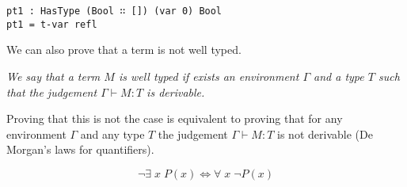 \documentclass{article}
\begin{document}
\begin{verbatim}
pt1 : HasType (Bool ∷ []) (var 0) Bool
pt1 = t-var refl
\end{verbatim}

We can also prove that a term is not well typed.

\vspace{1em}
\textit{We say that a term $M$ is well typed if exists an environment $\Gamma$ and a type $T$ such that the judgement $\Gamma \vdash M : T$ is derivable.}
\vspace{1em}

Proving that this is not the case is equivalent to proving that for any environment $\Gamma$ and any type $T$ the judgement $\Gamma \vdash M : T$ is not derivable (De Morgan’s laws for quantifiers).

\[
\neg \exists \; x \; P(x) \iff \forall \; x \; \neg P(x)
\]
\end{document}
